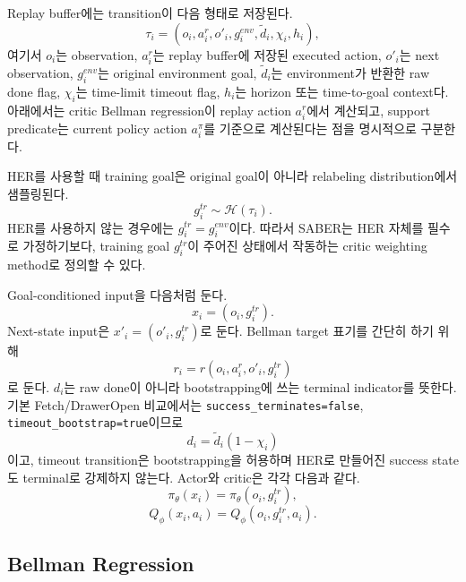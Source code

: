 \documentclass[letterpaper]{article}
\begin{document}
Replay buffer에는 transition이 다음 형태로 저장된다.
\begin{equation}
\tau_i = (o_i, a_i^r, o'_i, g_i^{env}, \tilde d_i, \chi_i, h_i),
\end{equation}
여기서 \(o_i\)는 observation, \(a_i^r\)는 replay buffer에 저장된 executed action, \(o'_i\)는 next observation, \(g_i^{env}\)는 original environment goal, \(\tilde d_i\)는 environment가 반환한 raw done flag, \(\chi_i\)는 time-limit timeout flag, \(h_i\)는 horizon 또는 time-to-goal context다. 아래에서는 critic Bellman regression이 replay action \(a_i^r\)에서 계산되고, support predicate는 current policy action \(a_i^\pi\)를 기준으로 계산된다는 점을 명시적으로 구분한다.

HER를 사용할 때 training goal은 original goal이 아니라 relabeling distribution에서 샘플링된다.
\begin{equation}
g_i^{tr} \sim \mathcal H(\tau_i).
\end{equation}
HER를 사용하지 않는 경우에는 \(g_i^{tr}=g_i^{env}\)이다. 따라서 SABER는 HER 자체를 필수로 가정하기보다, training goal \(g_i^{tr}\)이 주어진 상태에서 작동하는 critic weighting method로 정의할 수 있다.

Goal-conditioned input을 다음처럼 둔다.
\begin{equation}
x_i = (o_i, g_i^{tr}).
\end{equation}
Next-state input은 \(x'_i=(o'_i,g_i^{tr})\)로 둔다.
Bellman target 표기를 간단히 하기 위해
\begin{equation}
r_i = r(o_i,a_i^r,o'_i,g_i^{tr})
\end{equation}
로 둔다. \(d_i\)는 raw done이 아니라 bootstrapping에 쓰는 terminal indicator를 뜻한다. 기본 Fetch/DrawerOpen 비교에서는 \texttt{success\_terminates=false}, \texttt{timeout\_bootstrap=true}이므로
\begin{equation}
d_i = \tilde d_i(1-\chi_i)
\end{equation}
이고, timeout transition은 bootstrapping을 허용하며 HER로 만들어진 success state도 terminal로 강제하지 않는다.
Actor와 critic은 각각 다음과 같다.
\begin{equation}
\pi_\theta(x_i)=\pi_\theta(o_i,g_i^{tr}),
\end{equation}
\begin{equation}
Q_\phi(x_i,a_i)=Q_\phi(o_i,g_i^{tr},a_i).
\end{equation}

\subsection{Bellman Regression}
\end{document}
